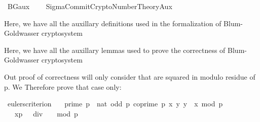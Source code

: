 %
\begin{isabellebody}%
%
%
\isadelimtheory
%
\endisadelimtheory
%
\isatagtheory
{}\isamarkupfalse%
\ BG{\isacharunderscore}{\kern0pt}aux\ \isanewline
\ \ \ Sigma{\isacharunderscore}{\kern0pt}Commit{\isacharunderscore}{\kern0pt}Crypto{\isachardot}{\kern0pt}Number{\isacharunderscore}{\kern0pt}Theory{\isacharunderscore}{\kern0pt}Aux\ \isanewline
{}%
\endisatagtheory
{\isafoldtheory}%
%
\isadelimtheory
%
\endisadelimtheory
%
\isadelimdocument
%
\endisadelimdocument
%
\isatagdocument
%
\isamarkuptrue%
%
\endisatagdocument
{\isafolddocument}%
%
\isadelimdocument
%
\endisadelimdocument
%
\begin{isamarkuptext}%
Here, we have all the auxillary definitions used in the formalization of Blum-Goldwasser cryptosystem%
\end{isamarkuptext}\isamarkuptrue%
%
\isadelimdocument
%
\endisadelimdocument
%
\isatagdocument
%
\isamarkuptrue%
%
\endisatagdocument
{\isafolddocument}%
%
\isadelimdocument
%
\endisadelimdocument
%
\begin{isamarkuptext}%
Here, we have all the auxillary lemmas used to prove the correctness of Blum-Goldwasser cryptosystem%
\end{isamarkuptext}\isamarkuptrue%
%
\begin{isamarkuptext}%
Out proof of correctness will only consider  that are squared in modulo residue of p. We 
Therefore prove that case only:%
\end{isamarkuptext}\isamarkuptrue%
\isamarkupfalse%
\ eulers{\isacharunderscore}{\kern0pt}criterion{\isacharcolon}{\kern0pt}\isanewline
\ \ \ {\isachardoublequoteopen}prime\ {\isacharparenleft}{\kern0pt}p\ {\isacharcolon}{\kern0pt}{\isacharcolon}{\kern0pt}\ nat{\isacharparenright}{\kern0pt}{\isachardoublequoteclose}\ {\isachardoublequoteopen}odd\ p{\isachardoublequoteclose}\ {\isachardoublequoteopen}coprime\ p\ x{\isachardoublequoteclose}\ {\isachardoublequoteopen}{\isacharparenleft}{\kern0pt}{\isasymexists}y{\isachardot}{\kern0pt}\ {\isacharbrackleft}{\kern0pt}y{\isacharcircum}{\kern0pt}{}\ {\isacharequal}{\kern0pt}\ x{\isacharbrackright}{\kern0pt}\ {\isacharparenleft}{\kern0pt}mod\ p{\isacharparenright}{\kern0pt}{\isacharparenright}{\kern0pt}{\isachardoublequoteclose}\isanewline
\ \ \ {\isachardoublequoteopen}{\isacharbrackleft}{\kern0pt}x{\isacharcircum}{\kern0pt}{\isacharparenleft}{\kern0pt}{\isacharparenleft}{\kern0pt}p\ {\isacharminus}{\kern0pt}\ {}{\isacharparenright}{\kern0pt}\ div\ {}{\isacharparenright}{\kern0pt}\ {\isacharequal}{\kern0pt}\ {}{\isacharbrackright}{\kern0pt}\ {\isacharparenleft}{\kern0pt}mod\ p{\isacharparenright}{\kern0pt}{\isachardoublequoteclose}\isanewline

\end{isabellebody}

